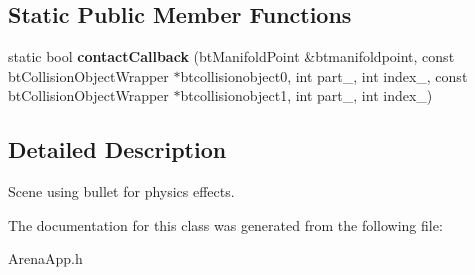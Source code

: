 \subsection*{Static Public Member Functions}
\begin{DoxyCompactItemize}
\item 
\hypertarget{class_arena_1_1_arena_app_a242d3cfaf76c6df459fc315750cac7d4}{static bool {\bfseries contact\+Callback} (bt\+Manifold\+Point \&btmanifoldpoint, const bt\+Collision\+Object\+Wrapper $\ast$btcollisionobject0, int part\+\_, int index\+\_, const bt\+Collision\+Object\+Wrapper $\ast$btcollisionobject1, int part\+\_, int index\+\_)}\label{class_arena_1_1_arena_app_a242d3cfaf76c6df459fc315750cac7d4}

\end{DoxyCompactItemize}


\subsection{Detailed Description}
Scene using bullet for physics effects. 

The documentation for this class was generated from the following file\+:\begin{DoxyCompactItemize}
\item 
Arena\+App.\+h\end{DoxyCompactItemize}

